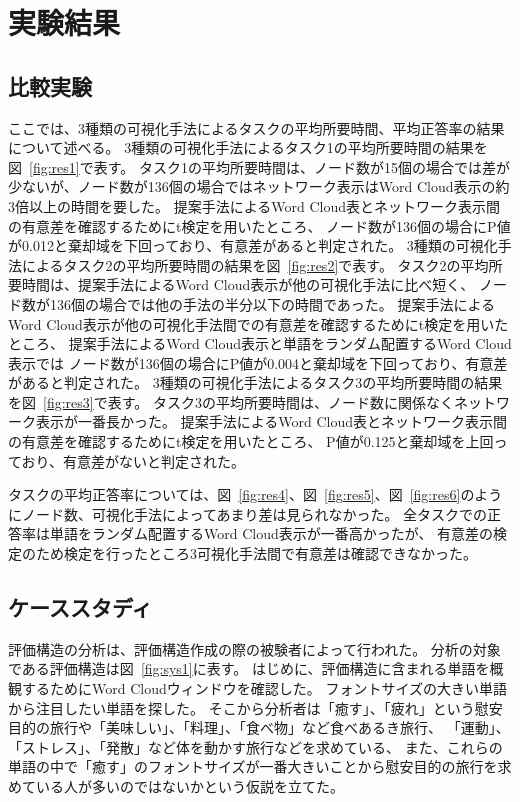 \documentclass[syuuron]{kuee}
\begin{document}
\chapter{実験結果}
	\section{比較実験}
	ここでは、3種類の可視化手法によるタスクの平均所要時間、平均正答率の結果について述べる。
	3種類の可視化手法によるタスク1の平均所要時間の結果を図~\ref{fig:res1}で表す。
	タスク1の平均所要時間は、ノード数が15個の場合では差が少ないが、ノード数が136個の場合ではネットワーク表示はWord Cloud表示の約3倍以上の時間を要した。
	提案手法によるWord Cloud表とネットワーク表示間の有意差を確認するためにt検定を用いたところ、
	ノード数が136個の場合にP値が0.012と棄却域を下回っており、有意差があると判定された。
	3種類の可視化手法によるタスク2の平均所要時間の結果を図~\ref{fig:res2}で表す。
	タスク2の平均所要時間は、提案手法によるWord Cloud表示が他の可視化手法に比べ短く、
	ノード数が136個の場合では他の手法の半分以下の時間であった。
	提案手法によるWord Cloud表示が他の可視化手法間での有意差を確認するためにt検定を用いたところ、
	提案手法によるWord Cloud表示と単語をランダム配置するWord Cloud表示では
	ノード数が136個の場合にP値が0.004と棄却域を下回っており、有意差があると判定された。
	3種類の可視化手法によるタスク3の平均所要時間の結果を図~\ref{fig:res3}で表す。
	タスク3の平均所要時間は、ノード数に関係なくネットワーク表示が一番長かった。
	提案手法によるWord Cloud表とネットワーク表示間の有意差を確認するためにt検定を用いたところ、
	P値が0.125と棄却域を上回っており、有意差がないと判定された。
	
	タスクの平均正答率については、図~\ref{fig:res4}、図~\ref{fig:res5}、図~\ref{fig:res6}のようにノード数、可視化手法によってあまり差は見られなかった。
	全タスクでの正答率は単語をランダム配置するWord Cloud表示が一番高かったが、
	有意差の検定のため検定を行ったところ3可視化手法間で有意差は確認できなかった。
		
	\section{ケーススタディ}
	評価構造の分析は、評価構造作成の際の被験者によって行われた。
	分析の対象である評価構造は図~\ref{fig:sys1}に表す。
	はじめに、評価構造に含まれる単語を概観するためにWord Cloudウィンドウを確認した。
	フォントサイズの大きい単語から注目したい単語を探した。
	そこから分析者は「癒す」、「疲れ」という慰安目的の旅行や「美味しい」、「料理」、「食べ物」など食べあるき旅行、
	「運動」、「ストレス」、「発散」など体を動かす旅行などを求めている、
	また、これらの単語の中で「癒す」のフォントサイズが一番大きいことから慰安目的の旅行を求めている人が多いのではないかという仮説を立てた。
	
\end{document}
